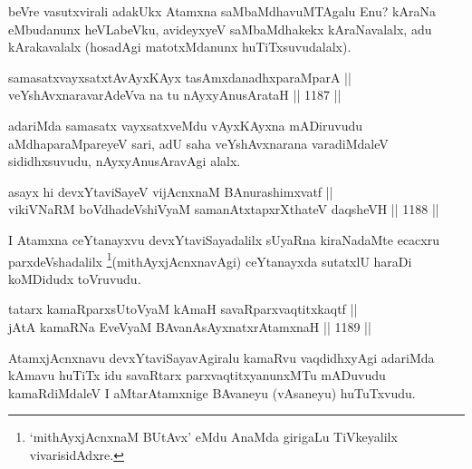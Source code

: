 \begin{artha}
beVre vasutxvirali adakUkx Atamxna saMbaMdhavuMTAgalu Enu? kAraNa eMbudanunx heVLabeVku, avideyxyeV saMbaMdhakekx kAraNavalalx, adu kArakavalalx (hosadAgi matotxMdanunx huTiTxsuvudalalx).
\end{artha}

\begin{shl}
samasatxvayxsatxtAvAyxKAyx tasAmxdanadhxparaMparA || \\
veYshAvxnaravarAdeVva na tu nAyxyAnusArataH ||  1187 ||  
\end{shl}

\begin{artha}
adariMda samasatx vayxsatxveMdu vAyxKAyxna mADiruvudu aMdhaparaMpareyeV sari, adU saha veYshAvxnarana varadiMdaleV sididhxsuvudu, nAyxyAnusAravAgi alalx.
\end{artha}



\begin{shl}
asayx hi devxYtaviSayeV vijAcnxnaM BAnurashimxvatf || \\
\footnotemark[2]vikiVNaRM boVdhadeVshiVyaM samanAtxtapxrXthateV daqsheVH ||  1188 ||  
\end{shl}

\begin{artha}
I Atamxna ceYtanayxvu devxYtaviSayadalilx sUyaRna kiraNadaMte ecacxru parxdeVshadalilx \footnote{`mithAyxjAcnxnaM BUtAvx' eMdu AnaMda girigaLu TiVkeyalilx vivarisidAdxre.}(mithAyxjAcnxnavAgi) ceYtanayxda sutatxlU haraDi koMDidudx toVruvudu.
\end{artha}

\begin{shl}
tatarx kamaRparxsUtoV\s yaM kAmaH savaRparxvaqtitxkaqtf || \\
jAtA kamaRNa EveVyaM BAvanA\s sAyxnatxrAtamxnaH ||  1189 ||  
\end{shl}

\begin{artha}
AtamxjAcnxnavu devxYtaviSayavAgiralu kamaRvu vaqdidhxyAgi adariMda kAmavu huTiTx idu savaRtarx parxvaqtitxyanunxMTu mADuvudu kamaRdiMdaleV I aMtarAtamxnige BAvaneyu (vAsaneyu) huTuTxvudu.
\end{artha}

